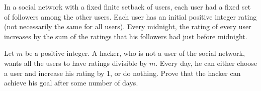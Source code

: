 In a social network with a fixed finite setback of users, each user had a fixed set of followers among the other users. Each user has an initial positive integer rating (not necessarily the same for all users). Every midnight, the rating of every user increases by the sum of the ratings that his followers had just before midnight.

Let $m$ be a positive integer. A hacker, who is not a user of the social network, wants all the users to have ratings divisible by $m$. Every day, he can either choose a user and increase his rating by 1, or do nothing. Prove that the hacker can achieve his goal after some number of days.
